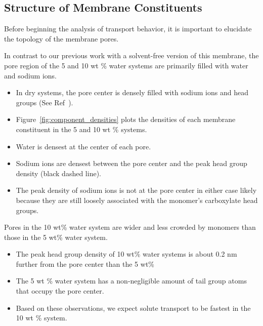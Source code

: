 \documentclass{article}
\begin{document}
  \subsection*{Structure of Membrane Constituents}\label{section:membrane_components}
  
  Before beginning the analysis of transport behavior, it is important to elucidate
  the topology of the membrane pores.  
  
  
  In contrast to our previous work with a solvent-free version of this membrane, the pore
  region of the 5 and 10 wt \% water systems are primarily filled with water and sodium
  ions.
  \begin{itemize}
    \item In dry systems, the pore center is densely filled with sodium ions and 
    head groups (See Ref~\cite{coscia_understanding_2019}).
    \item Figure~\ref{fig:component_densities} plots the densities of each
    membrane constituent in the 5 and 10 wt \% systems.
    \item Water is densest at the center of each pore. 
    \item Sodium ions are densest between the pore center and the peak head group density (black dashed line).
    \item The peak density of sodium ions is not at the pore center in either case
    likely because they are still loosely associated with the monomer's 
    carboxylate head groups.
  \end{itemize}
  
  \noindent Pores in the 10 wt\% water system are wider and less crowded by monomers than
  those in the 5 wt\% water system.
  \begin{itemize}
    \item The peak head group density of 10 wt\% water systems is about 0.2 nm
    further from the pore center than the 5 wt\%
    \item The 5 wt \% water system has a non-negligible amount of tail group atoms
    that occupy the pore center.
    \item Based on these observations, we expect solute transport to be fastest 
    in the 10 wt \% system.
  \end{itemize}
  
\end{document}
